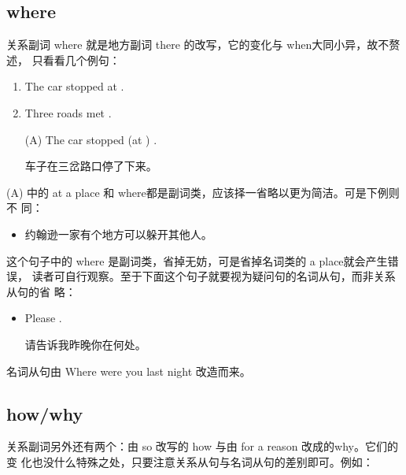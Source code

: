 \subsection{where}

关系副词 where 就是地方副词 there 的改写，它的变化与 when大同小异，故不赘述，
只看看几个例句：

\begin{enumerate}
\item The car stopped at .
\item Three roads met .

\reitem\label{3road} (A) The car stopped (at ) .

车子在三岔路口停了下来。
\end{enumerate}
(A) 中的 at a place 和 where都是副词类，应该择一省略以更为简洁。可是下例则不
同：
\begin{itemize}
\item {}  

  约翰逊一家有个地方可以躲开其他人。
\end{itemize}
这个句子中的 where 是副词类，省掉无妨，可是省掉名词类的 a place就会产生错误，
读者可自行观察。至于下面这个句子就要视为疑问句的名词从句，而非关系从句的省
略：

\begin{itemize}
\item Please   .

  请告诉我昨晚你在何处。
\end{itemize}
名词从句由 Where were you last night 改造而来。

\subsection{how/why}

关系副词另外还有两个：由 so 改写的 how 与由 for a reason 改成的why。它们的变
化也没什么特殊之处，只要注意关系从句与名词从句的差别即可。例如：

